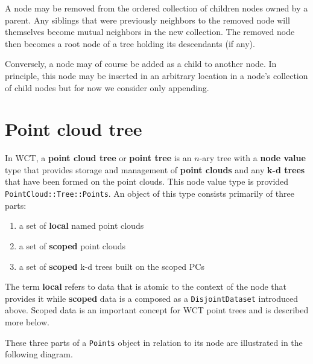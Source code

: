 \documentclass{article}
\begin{document}
A node may be removed from the ordered collection of children nodes owned by a parent. 
Any siblings that were previously neighbors to the removed node will themselves become mutual neighbors in the new collection. The removed node then becomes a root node of a tree holding its descendants (if any).

Conversely, a node may of course be added as a child to another node.  In principle, this node may be inserted in an arbitrary location in a node's collection of child nodes but for now we consider only appending.

\section{Point cloud tree}

In WCT, a \textbf{point cloud tree} or \textbf{point tree} is an $n$-ary tree with a \textbf{node value} type that provides storage and management of \textbf{point clouds} and any \textbf{k-d trees} that have been formed on the point clouds. 
This node value type is provided \texttt{PointCloud::Tree::Points}.  An object of this type consists primarily of three parts:

\begin{enumerate}
  \item a set of \textbf{local} named point clouds
  \item a set of \textbf{scoped} point clouds
  \item a set of \textbf{scoped} k-d trees built on the scoped PCs
\end{enumerate}
The term \textbf{local} refers to data that is atomic to the context of the node that provides it while 
\textbf{scoped} data is a composed as a \texttt{DisjointDataset} introduced above.   Scoped data is an important concept for WCT point trees and is described more below.

These three parts of a \texttt{Points} object in relation to its node are illustrated in the following diagram.
\end{document}
